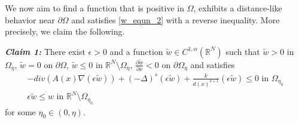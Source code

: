 \documentclass[reqno,oneside]{amsart}
\theoremstyle{definition}
\theoremstyle{remark}
\numberwithin{equation}{section}
\newcommand{\Om} {\Omega}
\newcommand{\sr}{\mathbb{R}}
\newcommand{\s}{(-\Delta)^s}
\newcommand{\pa}{\partial}
\newcommand{\na} {\nabla}
\begin{document}
We now aim to find a function that is positive in $\Om$, exhibits a distance-like behavior near $\pa \Omega$ and satisfies \eqref{w_equn_2} with a reverse inequality. More precisely, we claim the following.

\noindent\textit{\textbf{Claim 1:}} There exist $\epsilon >0$ and a function $\tilde{w} \in C^{1,\alpha} (\sr^N)$ such that $\tilde{w} >0$ in $\Om_{\eta}$, $\tilde{w}=0$ on $\pa\Om$, $\tilde{w} \leq 0$ in $\sr^N \setminus \Om_{\eta}$, $\frac{\pa \tilde{w}}{\pa\nu} < 0$ on $\pa\Om_{\eta}$ and satisfies
\begin{equation}
    \begin{aligned}
        -div \left(A(x)\na \left(\epsilon \tilde{w} \right) \right) + \s \left(\epsilon \tilde{w} \right) + \frac{k}{d(x)^{\delta +1}} \left(\epsilon \tilde{w} \right) \leq 0 \text{ in } \Om_{\eta_0}\\
        \epsilon \tilde{w} \leq w \text{ in } \sr^N \setminus \Om_{\eta_0}
    \end{aligned}
\end{equation}
for some $\eta_0 \in (0, \eta)$.
\vspace{5pt}
\end{document}

